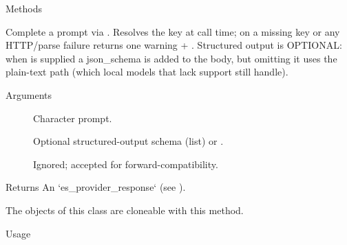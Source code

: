 \documentclass[a4paper]{book}
\begin{document}
\begin{Section}{Methods}
\begin{SubSection}{}
\end{SubSection}




\hypertarget{method-OpenAICompatProvider-complete}{}
%
\begin{SubSection}{}
Complete a prompt via .
Resolves the key at call time; on a missing key or any HTTP/parse failure
returns one warning + . Structured output is OPTIONAL: when
 is supplied a  json\_schema is added to
the body, but omitting it uses the plain-text path (which local models
that lack  support still handle).
%

%
\begin{SubSubSection}{Arguments}

\begin{description}

\item[] Character prompt.
\item[] Optional structured-output schema (list) or .
\item[] Ignored; accepted for forward-compatibility.

\end{description}



\end{SubSubSection}

%
\begin{SubSubSection}{Returns}
An `es\_provider\_response` (see ).

\end{SubSubSection}

\end{SubSection}




\hypertarget{method-OpenAICompatProvider-clone}{}
%
\begin{SubSection}{}
The objects of this class are cloneable with this method.
%
\begin{SubSubSection}{Usage}


\end{SubSubSection}
\end{SubSection}
\end{Section}
\end{document}
